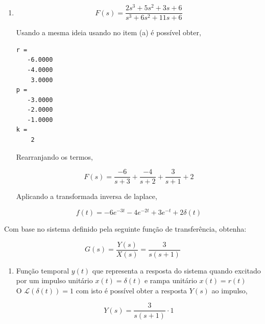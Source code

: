 \documentclass[a4paper, 10pt]{article}
\begin{document}
\begin{list}{\textbf{Questão .}}{
\setlength{\labelwidth}{-2mm} \setlength{\parsep}{0mm}
\setlength{\topsep}{0mm} \setlength{\leftmargin}{0mm}}
\begin{enumerate}
        Usando a mesma ideia usando no item (a) é possível obter, 

        \begin{lstlisting}
r = 
   -0.5000 - 0.2887i
   -0.5000 + 0.2887i
    1.0000 + 0.0000i

p = 
   -0.5000 + 0.8660i
   -0.5000 - 0.8660i
    0.0000 + 0.0000i

k = 
    []
    \end{lstlisting}


    \item

        $$
        F(s) = \frac{2 s^3 + 5 s^2 + 3 s + 6}{s^3 + 6 s^2 + 11 s + 6}
        $$

        Usando a mesma ideia usando no item (a) é possível obter, 

        \begin{lstlisting}
r = 
   -6.0000
   -4.0000
    3.0000
p = 
   -3.0000
   -2.0000
   -1.0000
k = 
    2
    \end{lstlisting}


        Rearranjando os termos, 

        $$
        F(s) = \frac{-6}{s+3} + \frac{-4}{s+2} + \frac{3}{s+1} + 2
        $$

        Aplicando a transformada inversa de laplace,

        $$
        f(t) = -6 e^{-3t} -4 e^{-2t} + 3 e^{-t} + 2 \delta(t)
        $$

    \end{enumerate}











\item 
    Com base no sistema definido pela seguinte função de transferência, obtenha:

    $$
    G(s) = \frac{Y(s)}{X(s)} = \frac{3}{s(s+1)}
    $$
    \begin{enumerate}
        \item
            Função temporal $y(t)$ que representa a resposta do sistema quando excitado
            por um impulso unitário $x(t)=\delta(t)$ e rampa unitário $x(t)=r(t)$ \\

            O $\mathcal{L}(\delta(t)) = 1$ com isto é possível obter a resposta 
            $Y(s)$ ao impulso, 
    
            $$
                Y(s) = \frac{3}{s(s+1)} \cdot 1
            $$


\end{enumerate}
\end{list}
\end{document}
